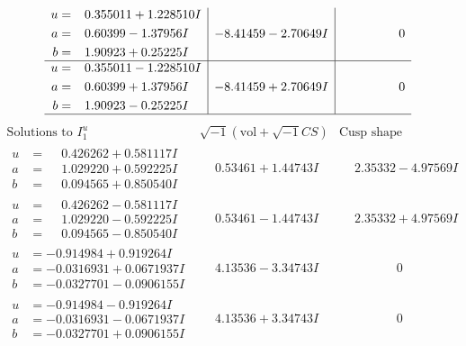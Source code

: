 \documentclass[1p]{elsarticle_modified}
\theoremstyle{definition}
\newcommand{\I}{\sqrt{-1}}
\begin{document}
$$\begin{array}{c|c|c}
\begin{aligned}
u &= \phantom{-}0.355011 + 1.228510 I \\
a &= \phantom{-}0.60399 - 1.37956 I \\
b &= \phantom{-}1.90923 + 0.25225 I\end{aligned}
 & -8.41459 - 2.70649 I & \phantom{-0.000000 } 0 \\ \hline\begin{aligned}
u &= \phantom{-}0.355011 - 1.228510 I \\
a &= \phantom{-}0.60399 + 1.37956 I \\
b &= \phantom{-}1.90923 - 0.25225 I\end{aligned}
 & -8.41459 + 2.70649 I & \phantom{-0.000000 } 0\\
 \hline 
 \end{array}$$\newpage$$\begin{array}{c|c|c}  
\text{Solutions to }I^u_{1}& \I (\text{vol} + \sqrt{-1}CS) & \text{Cusp shape}\\
 \hline 
\begin{aligned}
u &= \phantom{-}0.426262 + 0.581117 I \\
a &= \phantom{-}1.029220 + 0.592225 I \\
b &= \phantom{-}0.094565 + 0.850540 I\end{aligned}
 & \phantom{-}0.53461 + 1.44743 I & \phantom{-}2.35332 - 4.97569 I \\ \hline\begin{aligned}
u &= \phantom{-}0.426262 - 0.581117 I \\
a &= \phantom{-}1.029220 - 0.592225 I \\
b &= \phantom{-}0.094565 - 0.850540 I\end{aligned}
 & \phantom{-}0.53461 - 1.44743 I & \phantom{-}2.35332 + 4.97569 I \\ \hline\begin{aligned}
u &= -0.914984 + 0.919264 I \\
a &= -0.0316931 + 0.0671937 I \\
b &= -0.0327701 - 0.0906155 I\end{aligned}
 & \phantom{-}4.13536 - 3.34743 I & \phantom{-0.000000 } 0 \\ \hline\begin{aligned}
u &= -0.914984 - 0.919264 I \\
a &= -0.0316931 - 0.0671937 I \\
b &= -0.0327701 + 0.0906155 I\end{aligned}
 & \phantom{-}4.13536 + 3.34743 I & \phantom{-0.000000 } 0 \\ \hline\begin{aligned}

\end{aligned}
\end{array}$$
\end{document}
